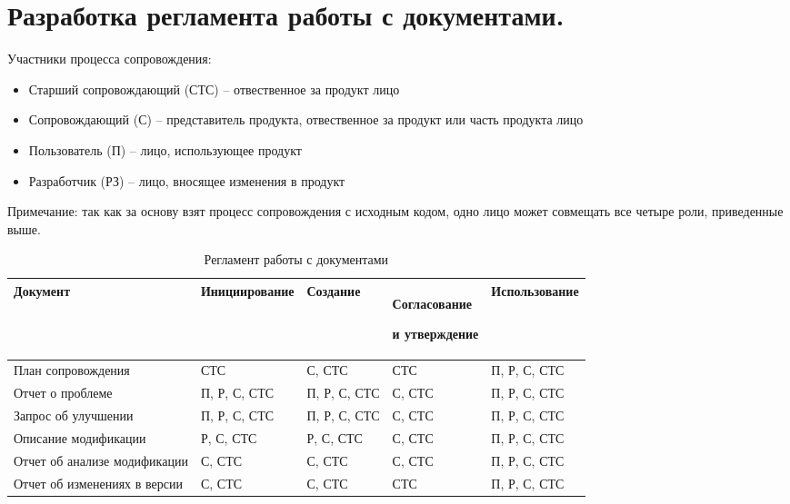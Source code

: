 
\pagebreak


\section{Разработка регламента работы с документами.}

Участники процесса сопровождения:
\begin{itemize}
    \item Старший сопровождающий (СТС) -- отвественное за продукт лицо
    \item Сопровождающий (С) -- представитель продукта, отвественное за продукт или часть продукта лицо
    \item Пользователь (П) -- лицо, использующее продукт
    \item Разработчик (РЗ) -- лицо, вносящее изменения в продукт
\end{itemize}

Примечание: так как за основу взят процесс сопровождения с исходным кодом, одно лицо может совмещать все четыре роли, приведенные выше.

\begin{center}
    \begin{longtable}{|p{3cm}|p{3.3cm}|p{3cm}|p{3cm}|p{3cm}|}
        \caption{Регламент работы с документами} \\
        \hline
        Документ                     & Инициирование & Создание     & Согласование \par и утверждение & Использование \\
        \hline
        План сопровождения           & СТС           & С, СТС       & СТС                             & П, Р, С, СТС  \\
        \hline
        Отчет о проблеме             & П, Р, С, СТС  & П, Р, С, СТС & С, СТС                          & П, Р, С, СТС  \\
        \hline
        Запрос об улучшении          & П, Р, С, СТС  & П, Р, С, СТС & С, СТС                          & П, Р, С, СТС  \\
        \hline
        Описание модификации         & Р, С, СТС     & Р, С, СТС    & С, СТС                          & П, Р, С, СТС  \\
        \hline
        Отчет об анализе модификации & С, СТС        & С, СТС       & С, СТС                          & П, Р, С, СТС  \\
        \hline
        Отчет об изменениях в версии & С, СТС        & С, СТС       & СТС                             & П, Р, С, СТС  \\
        \hline
    \end{longtable}
\end{center}
